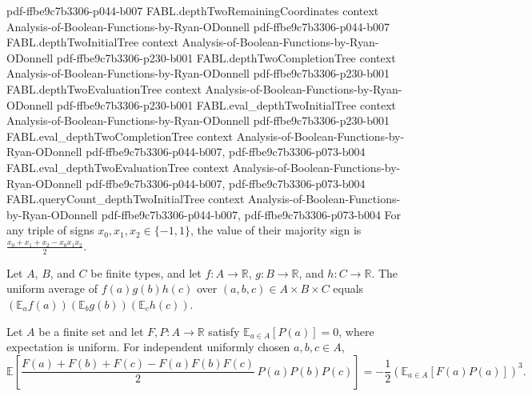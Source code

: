 \begin{theorem}
  {pdf-ffbe9c7b3306-p044-b007}
\proofstep
  {FABL.depthTwoRemainingCoordinates}
  {context}
  {Analysis-of-Boolean-Functions-by-Ryan-ODonnell}
  {pdf-ffbe9c7b3306-p044-b007}
\proofstep
  {FABL.depthTwoInitialTree}
  {context}
  {Analysis-of-Boolean-Functions-by-Ryan-ODonnell}
  {pdf-ffbe9c7b3306-p230-b001}
\proofstep
  {FABL.depthTwoCompletionTree}
  {context}
  {Analysis-of-Boolean-Functions-by-Ryan-ODonnell}
  {pdf-ffbe9c7b3306-p230-b001}
\proofstep
  {FABL.depthTwoEvaluationTree}
  {context}
  {Analysis-of-Boolean-Functions-by-Ryan-ODonnell}
  {pdf-ffbe9c7b3306-p230-b001}
\proofstep
  {FABL.eval_depthTwoInitialTree}
  {context}
  {Analysis-of-Boolean-Functions-by-Ryan-ODonnell}
  {pdf-ffbe9c7b3306-p230-b001}
\proofstep
  {FABL.eval_depthTwoCompletionTree}
  {context}
  {Analysis-of-Boolean-Functions-by-Ryan-ODonnell}
  {pdf-ffbe9c7b3306-p044-b007,
    pdf-ffbe9c7b3306-p073-b004}
\proofstep
  {FABL.eval_depthTwoEvaluationTree}
  {context}
  {Analysis-of-Boolean-Functions-by-Ryan-ODonnell}
  {pdf-ffbe9c7b3306-p044-b007,
    pdf-ffbe9c7b3306-p073-b004}
\proofstep
  {FABL.queryCount_depthTwoInitialTree}
  {context}
  {Analysis-of-Boolean-Functions-by-Ryan-ODonnell}
  {pdf-ffbe9c7b3306-p044-b007,
    pdf-ffbe9c7b3306-p073-b004}
For any triple of signs $x_0,x_1,x_2\in\{-1,1\}$, the value of their majority sign is
$\frac{x_0+x_1+x_2-x_0x_1x_2}{2}$.
\end{theorem}

\begin{theorem}
\label{FABL.expect_triple_mul_separate}
\leanok
{}
Let $A$, $B$, and $C$ be finite types, and let $f:A\to\mathbb{R}$, $g:B\to\mathbb{R}$,
and $h:C\to\mathbb{R}$. The uniform average of $f(a)g(b)h(c)$ over $(a,b,c)\in A\times
B\times C$ equals $(\mathbb{E}_a f(a))(\mathbb{E}_b g(b))(\mathbb{E}_c h(c))$.
\end{theorem}

\begin{theorem}
\label{FABL.expect_majorityThreeParity_step}
\leanok
{}
Let $A$ be a finite set and let $F,P:A\to\mathbb R$ satisfy $\mathbb E_{a\in
A}[P(a)]=0$, where expectation is uniform. For independent uniformly chosen $a,b,c\in
A$,
\[
\mathbb E\left[\frac{F(a)+F(b)+F(c)-F(a)F(b)F(c)}{2}\,P(a)P(b)P(c)\right]
=-\frac{1}{2}\left(\mathbb E_{a\in A}[F(a)P(a)]\right)^3.
\]
\end{theorem}

